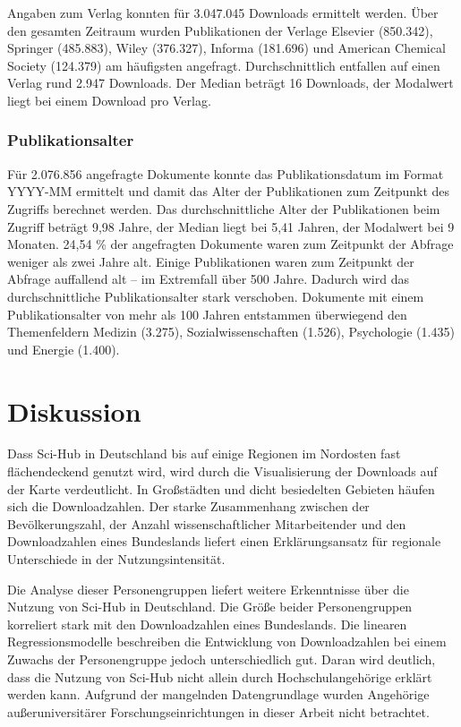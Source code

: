 \documentclass[a4paper,
fontsize=11pt,
oneside,
numbers=noperiodatend,
parskip=half-,
bibliography=totoc,
final
]{scrartcl}
\begin{document}
Angaben zum Verlag konnten für 3.047.045 Downloads ermittelt werden.
Über den gesamten Zeitraum wurden Publikationen der Verlage Elsevier
(850.342), Springer (485.883), Wiley (376.327), Informa (181.696) und
American Chemical Society (124.379) am häufigsten angefragt.
Durchschnittlich entfallen auf einen Verlag rund 2.947 Downloads. Der
Median beträgt 16 Downloads, der Modalwert liegt bei einem Download pro
Verlag.

\hypertarget{publikationsalter}{%
\subsubsection{Publikationsalter}\label{publikationsalter}}

Für 2.076.856 angefragte Dokumente konnte das Publikationsdatum im
Format YYYY-MM ermittelt und damit das Alter der Publikationen zum
Zeitpunkt des Zugriffs berechnet werden. Das durchschnittliche Alter der
Publikationen beim Zugriff beträgt 9,98 Jahre, der Median liegt bei 5,41
Jahren, der Modalwert bei 9 Monaten. 24,54 \% der angefragten Dokumente
waren zum Zeitpunkt der Abfrage weniger als zwei Jahre alt. Einige
Publikationen waren zum Zeitpunkt der Abfrage auffallend alt -- im
Extremfall über 500 Jahre. Dadurch wird das durchschnittliche
Publikationsalter stark verschoben. Dokumente mit einem
Publikationsalter von mehr als 100 Jahren entstammen überwiegend den
Themenfeldern Medizin (3.275), Sozialwissenschaften (1.526), Psychologie
(1.435) und Energie (1.400).

\hypertarget{diskussion}{%
\section{Diskussion}\label{diskussion}}

Dass Sci-Hub in Deutschland bis auf einige Regionen im Nordosten fast
flächendeckend genutzt wird, wird durch die Visualisierung der Downloads
auf der Karte verdeutlicht. In Großstädten und dicht besiedelten
Gebieten häufen sich die Downloadzahlen. Der starke Zusammenhang
zwischen der Bevölkerungszahl, der Anzahl wissenschaftlicher
Mitarbeitender und den Downloadzahlen eines Bundeslands liefert einen
Erklärungsansatz für regionale Unterschiede in der Nutzungsintensität.

Die Analyse dieser Personengruppen liefert weitere Erkenntnisse über die
Nutzung von Sci-Hub in Deutschland. Die Größe beider Personengruppen
korreliert stark mit den Downloadzahlen eines Bundeslands. Die linearen
Regressionsmodelle beschreiben die Entwicklung von Downloadzahlen bei
einem Zuwachs der Personengruppe jedoch unterschiedlich gut. Daran wird
deutlich, dass die Nutzung von Sci-Hub nicht allein durch
Hochschulangehörige erklärt werden kann. Aufgrund der mangelnden
Datengrundlage wurden Angehörige außeruniversitärer
Forschungseinrichtungen in dieser Arbeit nicht betrachtet.
\end{document}
